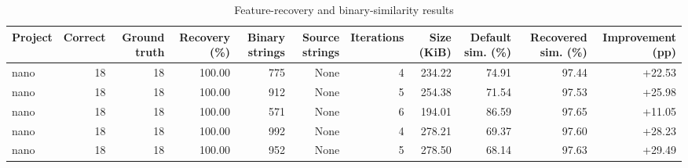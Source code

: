 \begin{table}[htbp]
\centering
\caption{Feature-recovery and binary-similarity results}
\label{tab:feature-recovery-results}
\small
\begin{tabular}{lrrrrrrrrrr}
\toprule
Project & Correct & Ground truth & Recovery (\%) & Binary strings & Source strings & Iterations & Size (KiB) & Default sim. (\%) & Recovered sim. (\%) & Improvement (pp) \\
\midrule
nano & 18 & 18 & 100.00 & 775 & None & 4 & 234.22 & 74.91 & 97.44 & +22.53 \\
nano & 18 & 18 & 100.00 & 912 & None & 5 & 254.38 & 71.54 & 97.53 & +25.98 \\
nano & 18 & 18 & 100.00 & 571 & None & 6 & 194.01 & 86.59 & 97.65 & +11.05 \\
nano & 18 & 18 & 100.00 & 992 & None & 4 & 278.21 & 69.37 & 97.60 & +28.23 \\
nano & 18 & 18 & 100.00 & 952 & None & 5 & 278.50 & 68.14 & 97.63 & +29.49 \\
\bottomrule
\end{tabular}
\end{table}
